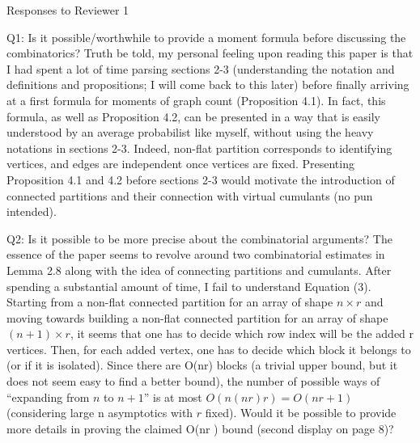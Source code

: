 \documentclass[11pt]{article}
\begin{document}
\pagestyle{empty} 

\begin{center} 
\large{Responses to Reviewer 1} %
\\ 
\end{center}

\noindent 

\noindent
\begin{description}
\item 
Q1: Is it possible/worthwhile to provide a moment formula before discussing
the combinatorics?
Truth be told, my personal feeling upon reading this paper is that I had spent
a lot of time parsing sections 2-3 (understanding the notation and definitions
and propositions; I will come back to this later) before finally arriving at a first formula for moments of graph count (Proposition 4.1). In fact, this formula, as
well as Proposition 4.2, can be presented in a way that is easily understood by
an average probabilist like myself, without using the heavy notations in sections
2-3. Indeed, non-flat partition corresponds to identifying vertices, and edges are
independent once vertices are fixed. Presenting Proposition 4.1 and 4.2 before
sections 2-3 would motivate the introduction of connected partitions and their
connection with virtual cumulants (no pun intended).
\item
  Q2: Is it possible to be more precise about the combinatorial arguments?
The essence of the paper seems to revolve around two combinatorial estimates in Lemma 2.8 along with the idea of connecting partitions and cumulants.
After spending a substantial amount of time, I fail to understand Equation (3).
Starting from a non-flat connected partition for an array of shape $n \times r$
and
moving towards building a non-flat connected partition for an array of shape
$(n + 1) \times r$, it seems that one has to decide which row index will be the added r vertices. Then, for each added vertex, one has to decide which block it belongs
to (or if it is isolated). Since there are O(nr) blocks (a trivial upper bound, but
it does not seem easy to find a better bound), the number of possible ways of
``expanding from $n$ to $n + 1$'' is at most $O(n(nr)r ) = O(nr+1 )$
(considering large
n asymptotics with $r$ fixed). Would it be possible to provide more details in
proving the claimed O(nr ) bound (second display on page 8)?

\end{description} 
\end{document}

